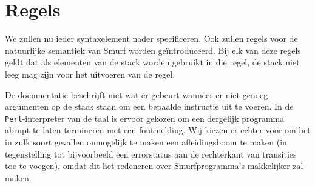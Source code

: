 \section{Regels} %
\label{sec:rules}

We zullen nu ieder syntaxelement nader specificeren. Ook zullen regels voor de
natuurlijke semantiek van Smurf worden geïntroduceerd. Bij elk van deze regels
geldt dat als elementen van de stack worden gebruikt in die regel, de stack
niet leeg mag zijn voor het uitvoeren van de regel. %

De documentatie \cite{safalra} beschrijft niet wat er gebeurt wanneer er niet
genoeg argumenten op de stack staan om een bepaalde instructie uit te voeren. In de \texttt{Perl}-interpreter van de taal is ervoor gekozen om een dergelijk programma abrupt te laten termineren met een foutmelding.
Wij kiezen er echter voor om het in zulk soort gevallen onmogelijk te maken een
afleidingsboom te maken (in tegenstelling tot bijvoorbeeld een errorstatus aan
de rechterkant van transities toe te voegen), omdat dit het redeneren over
Smurfprogramma's makkelijker zal maken.













